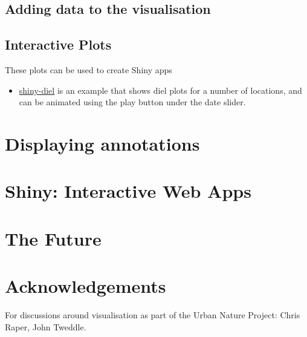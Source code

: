 \documentclass[
]{book}
\providecommand{\tightlist}{%
  \setlength{\itemsep}{0pt}\setlength{\parskip}{0pt}}
\begin{document}
\hypertarget{adding-to-cyclical}{%
\section{Adding data to the visualisation}\label{adding-to-cyclical}}

\hypertarget{interactive-plots}{%
\section{Interactive Plots}\label{interactive-plots}}

These plots can be used to create Shiny apps

\begin{itemize}
\tightlist
\item
  \href{https://shiny.ebaker.me.uk/shiny-diel/}{shiny-diel} is an example that shows diel plots for a number of locations, and can be animated using the play button under the date slider.
\end{itemize}

\hypertarget{displaying-annotations}{%
\chapter{Displaying annotations}\label{displaying-annotations}}

\hypertarget{shiny-interactive-web-apps}{%
\chapter{Shiny: Interactive Web Apps}\label{shiny-interactive-web-apps}}

\hypertarget{the-future}{%
\chapter{The Future}\label{the-future}}

\hypertarget{acknowledgements}{%
\chapter{Acknowledgements}\label{acknowledgements}}

For discussions around visualisation as part of the Urban Nature Project: Chris Raper, John Tweddle.

  
\end{document}
